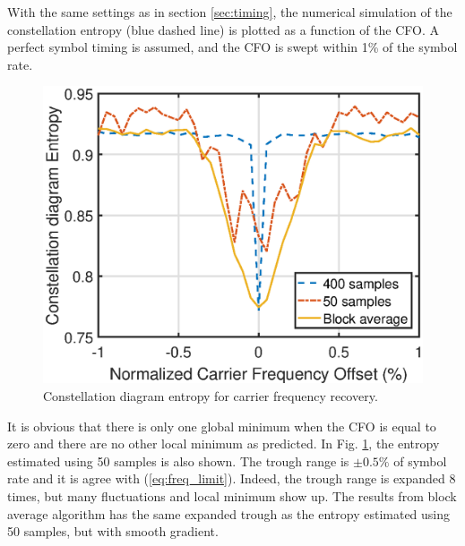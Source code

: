 \documentclass[journal,comsoc]{IEEEtran}
\begin{document}
With the same settings as in section \ref{sec:timing}, the numerical simulation of the constellation entropy (blue dashed line) is plotted as a function of the CFO.
A perfect symbol timing is assumed, and the CFO is swept within 1\% of the symbol rate.



\begin{figure}[ht]
\centering
\includegraphics[width=3 in]{pic/freq.eps}
\caption{Constellation diagram entropy for carrier frequency recovery.}
\label{fig:freq_entp} 
\end{figure}   

It is obvious that there is only one global minimum when the CFO is equal to zero and there are no other local minimum as predicted.
In Fig. \ref{fig:freq_entp}, the entropy estimated using 50 samples is also shown.
The trough range is \(\pm 0.5\%\) of symbol rate and it is agree with (\ref{eq:freq_limit}).
Indeed, the trough range is expanded 8 times, but many fluctuations and local minimum show up.
The results from block average algorithm has the same expanded trough as the entropy estimated using 50 samples, but with smooth gradient.
\end{document}
